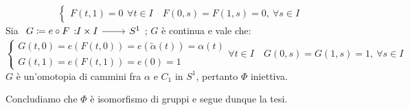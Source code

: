 \begin{demonstration}
\begin{itemize}
\begin{equation*}
\begin{cases}
					F(t,1)=0
				\end{cases}\forall t\in I\quad
				F(0,s)=F(1,s)=0,\ \forall s\in I
			\end{equation*}
				Sia $\funz {G\coloneqq e\circ F} {I\times I} {S^1}$; $G$ è continua e vale che:
				\begin{equation*}
					\begin{cases}
						G(t,0)=e(F(t,0))=e(\widetilde{\alpha}(t))=\alpha(t)\\
						G(t,1)=e(F(t,1))=e(0)=1
					\end{cases}\forall t\in I\quad
					G(0,s)=G(1,s)=1,\ \forall s\in I
				\end{equation*}
			$G$ è un'omotopia di cammini fra $\alpha$ e $C_1$ in $S^1$, pertanto $\Phi$ iniettiva.
		\end{itemize}
	Concludiamo che $\Phi$ è isomorfismo di gruppi e segue dunque la tesi.
\end{demonstration}

